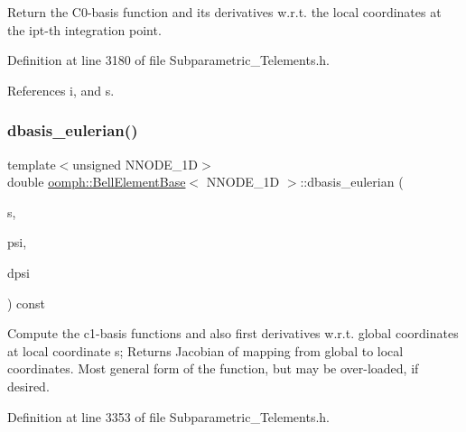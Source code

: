Return the C0-\/basis function and its derivatives w.\+r.\+t. the local coordinates at the ipt-\/th integration point. 



Definition at line 3180 of file Subparametric\+\_\+\+Telements.\+h.



References i, and s.

\mbox{\label{classoomph_1_1BellElementBase_a3264c8f4cac79ac554015658e1074dbc}} 
\subsubsection{\texorpdfstring{dbasis\+\_\+eulerian()}{dbasis\_eulerian()}}
{\footnotesize\ttfamily template$<$unsigned N\+N\+O\+D\+E\+\_\+1D$>$ \\
double \hyperlink{classoomph_1_1BellElementBase}{oomph\+::\+Bell\+Element\+Base}$<$ N\+N\+O\+D\+E\+\_\+1D $>$\+::dbasis\+\_\+eulerian (\begin{DoxyParamCaption}\item[{const \hyperlink{classoomph_1_1Vector}{Vector}$<$ double $>$ \&}]{s,  }\item[{\hyperlink{classoomph_1_1Shape}{Shape} \&}]{psi,  }\item[{\hyperlink{classoomph_1_1DShape}{D\+Shape} \&}]{dpsi }\end{DoxyParamCaption}) const\hspace{0.3cm}{\ttfamily [inline]}}



Compute the c1-\/basis functions and also first derivatives w.\+r.\+t. global coordinates at local coordinate s; Returns Jacobian of mapping from global to local coordinates. Most general form of the function, but may be over-\/loaded, if desired. 



Definition at line 3353 of file Subparametric\+\_\+\+Telements.\+h.

\mbox{\label{classoomph_1_1BellElementBase_a02f75fd57e4f6329a4b551df3d3c81eb}} 

